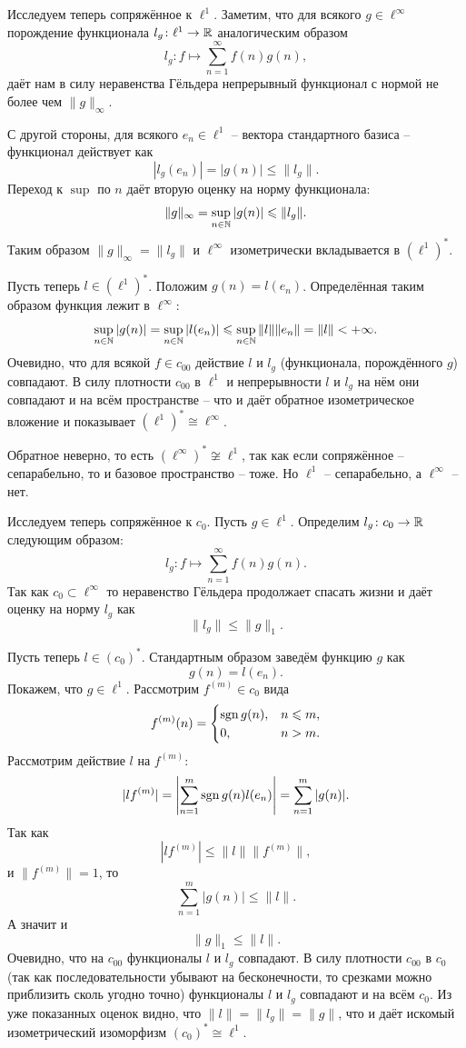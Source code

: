 \begin{solution}
    Исследуем теперь сопряжённое к $\ell^{1}$.
    Заметим, что для всякого $g \in \ell^\infty$ порождение функционала $l_g\colon \ell^1 \to \mathbb{R}$ аналогическим образом
    \[
        l_{g} \colon f \mapsto \sum_{n = 1}^{\infty} f(n)g(n),
    \]
    даёт нам в силу неравенства Гёльдера непрерывный функционал с нормой не более чем $\|g\|_\infty$.

    С другой стороны, для всякого $e_n \in \ell^1$ -- вектора стандартного базиса -- функционал действует как
    \[
        |l_g(e_n)| = |g(n)| \leq \|l_g\|.
    \]
    Переход к $\sup$ по $n$ даёт вторую оценку на норму функционала:
    \[
        \|g\|_{\infty} = \sup_{n \in \mathbb{N}} |g(n)| \leqslant \|l_g\|.
    \]
    Таким образом $\|g\|_\infty = \|l_g\|$ и $\ell^\infty$ изометрически вкладывается в $(\ell^1)^*$.

    Пусть теперь $l \in (\ell^1)^*$.
    Положим $g(n) = l(e_n)$.
    Определённая таким образом функция лежит в $\ell^\infty\colon$
    \[
        \sup_{n \in \mathbb{N}} |g(n)| = \sup_{n \in \mathbb{N}} |l(e_n)| \leqslant \sup_{n \in \mathbb{N}} \|l\|\|e_n\| = \|l\| < +\infty.
    \]
    Очевидно, что для всякой $f \in c_{00}$ действие $l$ и $l_g$ (функционала, порождённого $g$) совпадают.
    В силу плотности $c_{00}$ в $\ell^1$ и непрерывности $l$ и $l_g$ на нём они совпадают и на всём пространстве -- что и даёт обратное изометрическое вложение и показывает $(\ell^1)^* \cong \ell^\infty$.

    Обратное неверно, то есть $(\ell^{\infty})^* \not\cong \ell^1$, так как если сопряжённое -- сепарабельно, то и базовое пространство -- тоже.
    Но $\ell^1$ -- сепарабельно, а $\ell^{\infty}$ -- нет.

    Исследуем теперь сопряжённое к $c_0$.
    Пусть $g \in \ell^1$.
    Определим $l_g\colon c_0 \to \mathbb{R}$ следующим образом:
    \[
        l_g \colon f \mapsto \sum_{n = 1}^{\infty} f(n)g(n).
    \]
    Так как $c_0 \subset \ell^\infty$ то неравенство Гёльдера продолжает спасать жизни и даёт оценку на норму $l_g$ как
    \[
        \|l_g\| \leq \|g\|_1.
    \]

    Пусть теперь $l \in (c_0)^*$.
    Стандартным образом заведём функцию $g$ как
    \[
        g(n) = l(e_n).
    \]
    Покажем, что $g \in \ell^1$.
    Рассмотрим $f^{(m)} \in c_0$ вида
    \[
        f^{(m)}(n) =
        \begin{cases}
            \operatorname{sgn} g(n), & n \leqslant m, \\
            0, & n > m.
        \end{cases}
    \]
    Рассмотрим действие $l$ на $f^{(m)}\colon$
    \[
        |lf^{(m)}| = \left|\sum_{n = 1}^{m} \operatorname{sgn} g(n)l(e_n) \right| = \sum_{n = 1}^{m} |g(n)|.
    \]
    Так как
    \[
        |l f^{(m)}| \leq \|l\|\|f^{(m)}\|,
    \]
    и $\|f^{(m)}\| = 1$, то
    \[
        \sum_{n = 1}^{m} |g(n)| \leq \|l\|.
    \]
    А значит и
    \[
        \|g\|_1 \leq \|l\|.
    \]
    Очевидно, что на $c_{00}$ функционалы $l$ и $l_g$ совпадают.
    В силу плотности $c_{00}$ в $c_0$ (так как последовательности убывают на бесконечности, то срезками можно приблизить сколь угодно точно) функционалы $l$ и $l_g$ совпадают и на всём $c_0$.
    Из уже показанных оценок видно, что $\|l\| = \|l_g\| = \|g\|$, что и даёт искомый изометрический изоморфизм $(c_0)^* \cong \ell^1$.


\end{solution}
